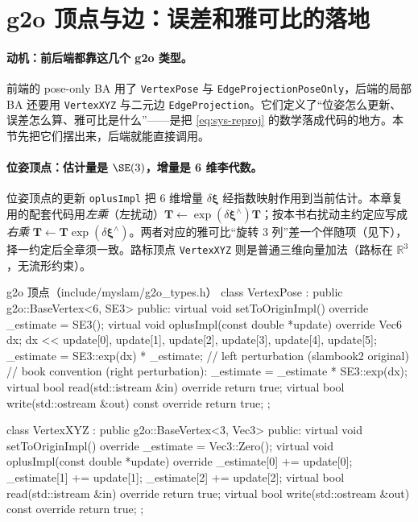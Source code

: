 \section{g2o 顶点与边：误差和雅可比的落地}
\label{sec:sys-jacobian}

\paragraph{动机：前后端都靠这几个 g2o 类型。}
前端的 pose-only BA 用了 \texttt{VertexPose} 与 \texttt{EdgeProjectionPoseOnly}，后端的局部 BA 还要用 \texttt{VertexXYZ} 与二元边 \texttt{EdgeProjection}。它们定义了“位姿怎么更新、误差怎么算、雅可比是什么”——是把 \cref{eq:sys-reproj} 的数学落成代码的地方。本节先把它们摆出来，后端就能直接调用。

\paragraph{位姿顶点：估计量是 $\SE(3)$，增量是 6 维李代数。}
位姿顶点的更新 \texttt{oplusImpl} 把 6 维增量 $\delta\boldsymbol\xi$ 经指数映射作用到当前估计。本章复用的配套代码用\emph{左乘}（左扰动）$\mathbf{T}\leftarrow\exp(\delta\boldsymbol\xi^\wedge)\mathbf{T}$\cite{gaoxiang2019slam14}；按本书右扰动主约定应写成\emph{右乘} $\mathbf{T}\leftarrow\mathbf{T}\exp(\delta\boldsymbol\xi^\wedge)$。两者对应的雅可比“旋转 3 列”差一个伴随项（见下），择一约定后全章须一致。路标顶点 \texttt{VertexXYZ} 则是普通三维向量加法（路标在 $\mathbb{R}^3$，无流形约束）。

\begin{codebox}[C++]{g2o 顶点（include/myslam/g2o\_types.h）}
class VertexPose : public g2o::BaseVertex<6, SE3> {
   public:
    virtual void setToOriginImpl() override { _estimate = SE3(); }
    virtual void oplusImpl(const double *update) override {
        Vec6 dx;
        dx << update[0], update[1], update[2], update[3], update[4], update[5];
        _estimate = SE3::exp(dx) * _estimate;     // left perturbation (slambook2 original)
        // book convention (right perturbation): _estimate = _estimate * SE3::exp(dx);
    }
    virtual bool read(std::istream &in) override  { return true; }
    virtual bool write(std::ostream &out) const override { return true; }
};

class VertexXYZ : public g2o::BaseVertex<3, Vec3> {
   public:
    virtual void setToOriginImpl() override { _estimate = Vec3::Zero(); }
    virtual void oplusImpl(const double *update) override {
        _estimate[0] += update[0]; _estimate[1] += update[1]; _estimate[2] += update[2];
    }
    virtual bool read(std::istream &in) override  { return true; }
    virtual bool write(std::ostream &out) const override { return true; }
};
\end{codebox}

